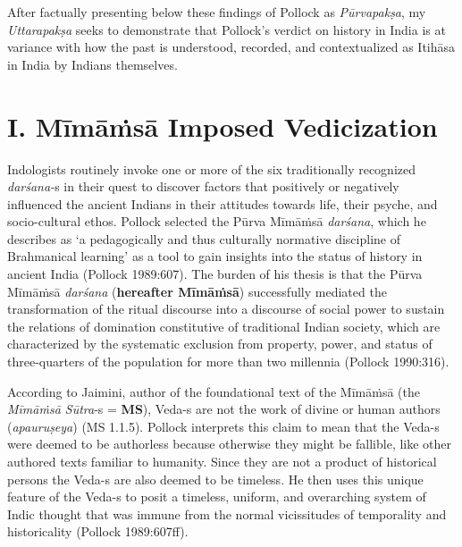 After factually presenting below these findings of Pollock as \textit{Pūrvapakṣa}, my \textit{Uttarapakṣa} seeks to demonstrate that Pollock’s verdict on history in India is at variance with how the past is understood, recorded, and contextualized as Itihāsa in India by Indians themselves.


\section*{I. Mīmāṁsā Imposed Vedicization}


Indologists routinely invoke one or more of the six traditionally recognized \textit{darśana-}s in their quest to discover factors that positively or negatively influenced the ancient Indians in their attitudes towards life, their psyche, and socio-cultural ethos. Pollock selected the Pūrva Mīmāṁsā \textit{darśana}, which he describes as ‘a pedagogically and thus culturally normative discipline of Brahmanical learning’ as a tool to gain insights into the status of history in ancient India (Pollock 1989:607). The burden of his thesis is that the Pūrva Mīmāṁsā \textit{darśana} (\textbf{hereafter Mīmāṁsā}) successfully mediated the transformation of the ritual discourse into a discourse of social power to sustain the relations of domination constitutive of traditional Indian society, which are characterized by the systematic exclusion from property, power, and status of three-quarters of the population for more than two millennia (Pollock 1990:316).

According to Jaimini, author of the foundational text of the Mīmāṁsā (the \textit{Mīmāṁsā Sūtra}-s = \textbf{MS}), Veda-s are not the work of divine or human authors (\textit{apauruṣeya}) (MS 1.1.5). Pollock interprets this claim to mean that the Veda-s were deemed to be authorless because otherwise they might be fallible, like other authored texts familiar to humanity. Since they are not a product of historical persons the Veda-s are also deemed to be timeless. He then uses this unique feature of the Veda-s to posit a timeless, uniform, and overarching system of Indic thought that was immune from the normal vicissitudes of temporality and historicality (Pollock 1989:607ff).

